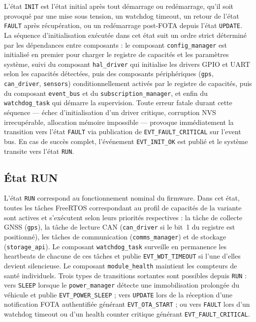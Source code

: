 L'état \texttt{INIT} est l'état initial après tout démarrage ou
redémarrage, qu'il soit provoqué par une mise sous tension, un
watchdog timeout, un retour de l'état \texttt{FAULT} après
récupération, ou un redémarrage post-FOTA depuis l'état
\texttt{UPDATE}. La séquence d'initialisation exécutée dans cet
état suit un ordre strict déterminé par les dépendances entre
composants : le composant \texttt{config\_manager} est initialisé
en premier pour charger le registre de capacités et les paramètres
système, suivi du composant \texttt{hal\_driver} qui initialise
les drivers GPIO et UART selon les capacités détectées, puis des
composants périphériques (\texttt{gps}, \texttt{can\_driver},
\texttt{sensors}) conditionnellement activés par le registre de
capacités, puis du composant \texttt{event\_bus} et du
\texttt{subscription\_manager}, et enfin du \texttt{watchdog\_task}
qui démarre la supervision. Toute erreur fatale durant cette
séquence — échec d'initialisation d'un driver critique, corruption
NVS irrecupérable, allocation mémoire impossible — provoque
immédiatement la transition vers l'état \texttt{FAULT} via
publication de \texttt{EVT\_FAULT\_CRITICAL} sur l'event bus.
En cas de succès complet, l'événement \texttt{EVT\_INIT\_OK} est
publié et le système transite vers l'état \texttt{RUN}.

\subsection{État RUN}
\label{subsec:fsm_run}

L'état \texttt{RUN} correspond au fonctionnement nominal du firmware.
Dans cet état, toutes les tâches FreeRTOS correspondant au profil de
capacités de la variante sont actives et s'exécutent selon leurs
priorités respectives : la tâche de collecte GNSS (\texttt{gps}),
la tâche de lecture CAN (\texttt{can\_driver} si le bit~1 du registre
est positionné), les tâches de communication (\texttt{comms\_manager})
et de stockage (\texttt{storage\_api}). Le composant \texttt{watchdog\_task}
surveille en permanence les heartbeats de chacune de ces tâches et
publie \texttt{EVT\_WDT\_TIMEOUT} si l'une d'elles devient silencieuse.
Le composant \texttt{module\_health} maintient les compteurs de santé
individuels. Trois types de transitions sortantes sont possibles depuis
\texttt{RUN} : vers \texttt{SLEEP} lorsque le \texttt{power\_manager}
détecte une immobilisation prolongée du véhicule et publie
\texttt{EVT\_POWER\_SLEEP} ; vers \texttt{UPDATE} lors de la
réception d'une notification FOTA authentifiée générant
\texttt{EVT\_OTA\_START} ; ou vers \texttt{FAULT} lors d'un
watchdog timeout ou d'un health counter critique générant
\texttt{EVT\_FAULT\_CRITICAL}.

